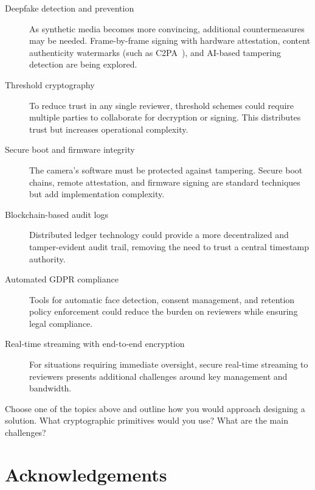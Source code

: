 \begin{description}
  \item[Deepfake detection and prevention] As synthetic media becomes more 
    convincing, additional countermeasures may be needed.
    Frame-by-frame signing with hardware attestation, content authenticity
    watermarks (such as C2PA~\autocite{C2PAspec}), and AI-based tampering
    detection are being explored.
  \item[Threshold cryptography] To reduce trust in any single reviewer, 
    threshold schemes could require multiple parties to collaborate for 
    decryption or signing.
    This distributes trust but increases operational complexity.
  \item[Secure boot and firmware integrity] The camera's software must be 
    protected against tampering.
    Secure boot chains, remote attestation, and firmware signing are standard 
    techniques but add implementation complexity.
  \item[Blockchain-based audit logs] Distributed ledger technology could 
    provide a more decentralized and tamper-evident audit trail, removing the 
    need to trust a central timestamp authority.
  \item[Automated \ac{GDPR} compliance] Tools for automatic face detection,
    consent management, and retention policy enforcement could reduce the
    burden on reviewers while ensuring legal compliance.
  \item[Real-time streaming with end-to-end encryption] For situations 
    requiring immediate oversight, secure real-time streaming to reviewers 
    presents additional challenges around key management and bandwidth.
\end{description}

\begin{exercise}
  Choose one of the topics above and outline how you would approach designing a 
  solution.
  What cryptographic primitives would you use?
  What are the main challenges?
\end{exercise}


\section*{Acknowledgements}

